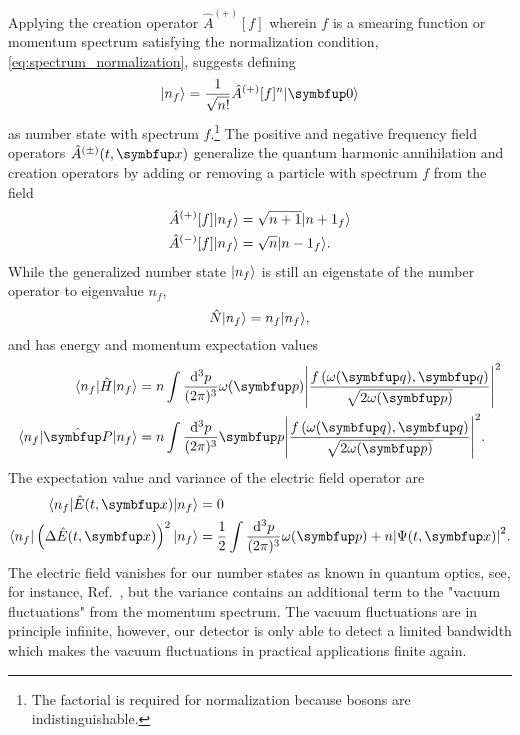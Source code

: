 Applying the creation operator $\hat{A}^{(+)}[f]$ wherein $f$ is a smearing function or momentum spectrum satisfying the normalization condition, \cref{eq:spectrum_normalization}, suggests defining
\begin{equation}
	\ket{n_f}
	=
	\frac{1}{\sqrt{n!}}
	\hat{A}^{(+)}[f]^n
	\vacket
	\label{eq:number_state}
\end{equation}
as number state with spectrum $f$.\footnote{The factorial is required for normalization because bosons are indistinguishable.}
The positive and negative frequency field operators $\hat{A}^{(\pm)}(t,\vb{x})$ generalize the quantum harmonic annihilation and creation operators by adding or removing a particle with spectrum $f$ from the field
\begin{align}
	\hat{A}^{(+)}[f]
	\lvert n_f\rangle
	&=
	\sqrt{n+1}
	\lvert{n+1}_f\rangle
	\\
	\hat{A}^{(-)}[f]
	\lvert n_f\rangle
	&=
	\sqrt{n}
	\lvert{n-1}_f\rangle
	.
\end{align}
While the generalized number state $\lvert n_f\rangle$ is still an eigenstate of the number operator to eigenvalue $n_f$,
\begin{equation}
	\hat{N}
	\lvert n_f\rangle
	=
	n_f
	\lvert n_f\rangle
	,
\end{equation}
and has energy and momentum expectation values
\begin{align}
	\bra{n_f}
	\hat{H}
	\ket{n_f}
	&=
	n
	\int\frac{\dd[3]{p}}{(2\pi)^3}
	\omega(\vb{p})
	\abs*{\frac{f\left(\omega(\vb{q}),\vb{q}\right)}{\sqrt{2\omega(\vb{p})}}}^2
	\\
	\bra{n_f}
	\vu{P}
	\ket{n_f}
	&=
	n
	\int\frac{\dd[3]{p}}{(2\pi)^3}
	\vb{p}
	\abs*{\frac{f\left(\omega(\vb{q}),\vb{q}\right)}{\sqrt{2\omega(\vb{p})}}}^2
	.
\end{align}
The expectation value and variance of the electric field operator are
\begin{align}
	\bra{n_f}
	\hat{E}(t,\vb{x})
	\ket{n_f}
	&=
	0
	\\
	\bra{n_f}
	\left(
		\Delta
		\hat{E}(t,\vb{x})
	\right)^2
	\ket{n_f}
	&=
	\frac{1}{2}
	\int\frac{\dd[3]{p}}{(2\pi)^3}
	\omega(\vb{p})
	+
	n
	\abs*{\Psi(t,\vb{x})}^2
	.
\end{align}
The electric field vanishes for our number states as known in quantum optics, see, for instance, Ref.~\cite{Gerry2005}, but the variance contains an additional term to the "vacuum fluctuations" from the momentum spectrum.
The vacuum fluctuations are in principle infinite, however, our detector is only able to detect a limited bandwidth which makes the vacuum fluctuations in practical applications finite again.

